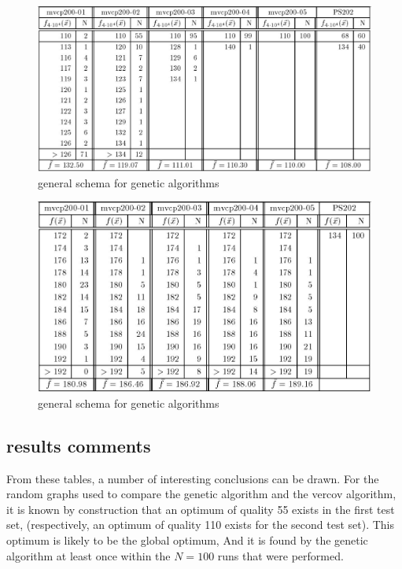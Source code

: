 \documentclass[12pt]{article}
\begin{document}
\begin{figure}[!htbp]
\centering
\includegraphics[width=1\textwidth]{t3}
\caption{general schema for genetic algorithms}
\label{fig:t3}
\end{figure}

\begin{figure}[!htbp]
\centering
\includegraphics[width=1\textwidth]{t4}
\caption{general schema for genetic algorithms}
\label{fig:t4}
\end{figure}


\subsection{results comments}
From these tables, a number of interesting conclusions
can be drawn. For the random graphs used to compare the
genetic algorithm and the vercov algorithm,
it is known by construction that an optimum of quality 55 exists in the first test set,
(respectively, an optimum of quality 110 exists for the second test set). This optimum is likely to be the
global optimum, And it is found by the genetic
algorithm at least once within the $N = 100$ runs that were performed.
\end{document}
